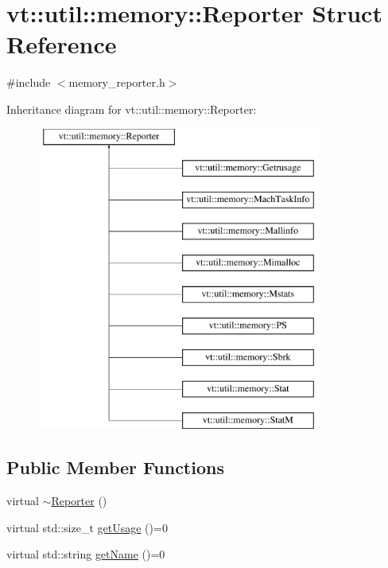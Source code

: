\hypertarget{structvt_1_1util_1_1memory_1_1_reporter}{}\section{vt\+:\+:util\+:\+:memory\+:\+:Reporter Struct Reference}
\label{structvt_1_1util_1_1memory_1_1_reporter}


{\ttfamily \#include $<$memory\+\_\+reporter.\+h$>$}

Inheritance diagram for vt\+:\+:util\+:\+:memory\+:\+:Reporter\+:\begin{figure}[H]
\begin{center}
\leavevmode
\includegraphics[height=10.000000cm]{structvt_1_1util_1_1memory_1_1_reporter}
\end{center}
\end{figure}
\subsection*{Public Member Functions}
\begin{DoxyCompactItemize}
\item 
virtual \hyperlink{structvt_1_1util_1_1memory_1_1_reporter_a9b5c8c4345a2e1d758fd9f583d5ea63a}{$\sim$\+Reporter} ()
\item 
virtual std\+::size\+\_\+t \hyperlink{structvt_1_1util_1_1memory_1_1_reporter_a372574f51fdb68077cd3d227ee373de5}{get\+Usage} ()=0
\item 
virtual std\+::string \hyperlink{structvt_1_1util_1_1memory_1_1_reporter_a83fc36e9cff3ce2deedf1d4546694713}{get\+Name} ()=0
\end{DoxyCompactItemize}


